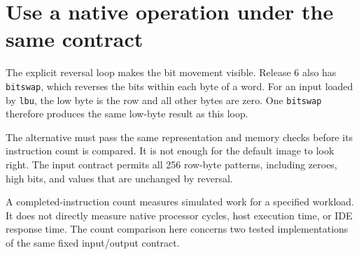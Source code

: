 \section{Use a native operation under the same
  contract}\label{003-eight-byte-sprite-p10-use-a-native-operation-under-the-same-contract}

The explicit reversal loop makes the bit movement visible. Release 6
also has \texttt{bitswap}, which reverses the bits within each byte of a
word. For an input loaded by \texttt{lbu}, the low byte is the row and
all other bytes are zero. One \texttt{bitswap} therefore produces the
same low-byte result as this loop.

The alternative must pass the same representation and memory checks
before its instruction count is compared. It is not enough for the
default image to look right. The input contract permits all 256 row-byte
patterns, including zeroes, high bits, and values that are unchanged by
reversal.

A completed-instruction count measures simulated work for a specified
workload. It does not directly measure native processor cycles, host
execution time, or IDE response time. The count comparison here concerns
two tested implementations of the same fixed input/output contract.
